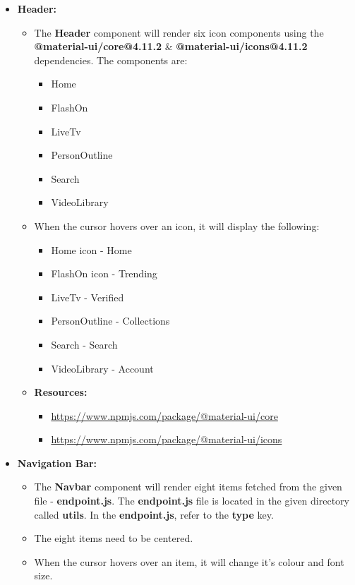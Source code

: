 \documentclass{article}
\begin{document}
\begin{itemize}
	\item \textbf{Header:}
	\begin{itemize}
		\item The \textbf{Header} component will render six icon components using the \textbf{@material-ui/core@4.11.2} \& \textbf{@material-ui/icons@4.11.2} dependencies. The components are:
		\begin{itemize}
			\item Home
			\item FlashOn
			\item LiveTv
			\item PersonOutline
			\item Search
			\item VideoLibrary
		\end{itemize} 
		\item When the cursor hovers over an icon, it will display the following:
		\begin{itemize}
			\item Home icon - Home
			\item FlashOn icon - Trending
			\item LiveTv - Verified
			\item PersonOutline - Collections
			\item Search - Search
			\item VideoLibrary - Account
		\end{itemize}
		\item \textbf{Resources:} 
		\begin{itemize}
			\item \href{https://www.npmjs.com/package/@material-ui/core}{https://www.npmjs.com/package/@material-ui/core}
			\item \href{https://www.npmjs.com/package/@material-ui/icons}{https://www.npmjs.com/package/@material-ui/icons}
		\end{itemize}
	\end{itemize}
	\item \textbf{Navigation Bar:}
	\begin{itemize}
		\item The \textbf{Navbar} component will render eight items fetched from the given file - \textbf{endpoint.js}. The \textbf{endpoint.js} file is located in the given directory called \textbf{utils}. In the \textbf{endpoint.js}, refer to the \textbf{type} key.
		\item The eight items need to be centered.
		\item When the cursor hovers over an item, it will change it's colour and font size.

\end{itemize}
\end{itemize}
\end{document}
